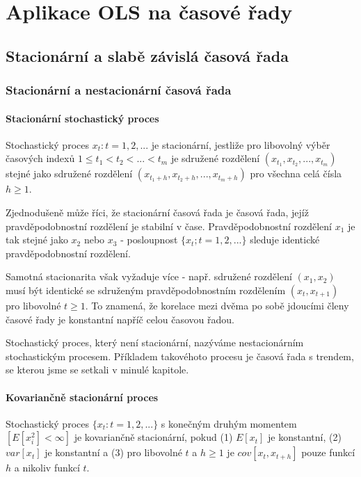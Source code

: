 \chapter{Aplikace OLS na časové řady}

\section{Stacionární a slabě závislá časová řada}

\subsection{Stacionární a nestacionární časová řada}

\subsubsection{Stacionární stochastický proces}

Stochastický 
proces ${x_t: t = 1, 2, ...}$ je stacionární, jestliže pro 
libovolný výběr časových indexů $1 \le t_1 < t_2 < ... < t_m$ je 
sdružené rozdělení $(x_{t_1}, x_{t_2}, ..., x_{t_m})$ stejné jako 
sdružené rozdělení $(x_{t_1 + h}, x_{t_2 + h}, ..., x_{t_m + h})$ 
pro všechna celá čísla $h \ge 1$.

Zjednodušeně může říci, že 
stacionární časová řada je časová řada, jejíž 
pravděpodobnostní rozdělení je stabilní v čase. 
Pravděpodobnostní rozdělení $x_1$ je tak stejné jako $x_2$ nebo 
$x_3$ - posloupnost $\{x_t; t = 1, 2, ...\}$ sleduje identické 
pravděpodobnostní rozdělení.

Samotná stacionarita však vyžaduje více - např. sdružené 
rozdělení $(x_1, x_2)$ musí být identické se sdruženým 
pravděpodobnostním rozdělením $(x_t, x_{t + 1})$ pro libovolné $t 
\ge 1$. To znamená, že korelace mezi dvěma po sobě jdoucími členy 
časové řady je konstantní napříč celou časovou řadou.

Stochastický proces, který není stacionární, nazýváme 
nestacionárním stochastickým procesem. Příkladem takovéhoto 
procesu je časová řada s trendem, se kterou jsme se setkali v 
minulé kapitole.

\subsubsection{Kovariančně stacionární proces}

Stochastický proces $\{x_t: t = 1, 2, ...\}$ s konečným druhým 
momentem $[E[x_i^2] < \infty]$ je kovariančně stacionární, pokud 
(1) $E[x_t]$ je konstantní, (2) $var[x_t]$ je konstantní a (3) pro 
libovolné $t$ a $h \ge 1$ je $cov[x_t, x_{t + h}]$ pouze funkcí $h$ a 
nikoliv funkcí $t$.

